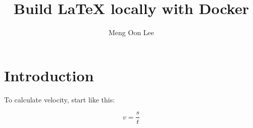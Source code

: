 \documentclass[12pt, a4paper]{article}
\begin{document}
\title{Build LaTeX locally with Docker}
\author{Meng Oon Lee}
\date{} 

\maketitle

\section{Introduction}

To calculate velocity, start like this:

\begin{equation*}
v = \frac{s}{t}
\end{equation*}
\end{document}
